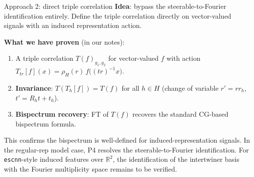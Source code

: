 \documentclass[aspectratio=169]{beamer}
\newcommand{\R}{\mathbb{R}}
\begin{document}
\begin{frame}{Approach 2: direct triple correlation}\small
  \textbf{Idea}: bypass the steerable-to-Fourier identification entirely. Define the triple correlation directly on vector-valued signals with an induced representation action.

  \smallskip

  \textbf{What we have proven} (in our notes):
  \begin{enumerate}\setlength{\itemsep}{1pt}
    \item A triple correlation $T(f)_{g_1, g_2}$ for vector-valued $f$ with action $T_{tr}[f](x) = \rho_H(r) \, f\bigl((tr)^{-1}x\bigr)$.
    \item \textbf{Invariance}: $T(T_h[f]) = T(f)$ for all $h \in H$ (change of variable $r' = rr_h$, $t' = R_h t + t_h$).
    \item \textbf{Bispectrum recovery}: FT of $T(f)$ recovers the standard CG-based bispectrum formula.
  \end{enumerate}

  \smallskip

  This confirms the bispectrum is well-defined for induced-representation signals. In the regular-rep model case, P4 resolves the steerable-to-Fourier identification. For \texttt{escnn}-style induced features over $\R^2$, the identification of the intertwiner basis with the Fourier multiplicity space \alert{remains to be verified}.
\end{frame}
\end{document}
